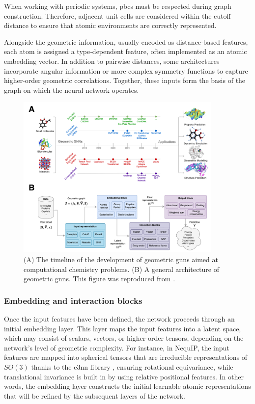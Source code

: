 When working with periodic systems, \acp{pbc} must be respected during graph construction. Therefore, adjacent unit cells are considered within the cutoff distance to ensure that atomic environments are correctly represented.

Alongside the geometric information, usually encoded as distance-based features, each atom is assigned a type-dependent feature, often implemented as an atomic embedding vector. In addition to pairwise distances, some architectures incorporate angular information or more complex symmetry functions to capture higher-order geometric correlations. Together, these inputs form the basis of the graph on which the neural network operates.

\begin{figure}[t!]
    \centering
    \includegraphics[width=0.9\textwidth]{Figures/2_Theory/equivariant_gnns.png}
    \caption{(A) The timeline of the development of geometric \acp{gnn} aimed at computational chemistry problems. (B) A general architecture of geometric \acp{gnn}. This figure was reproduced from \citep{duvalHitchhikersGuideGeometric2024}.}
    \label{fig:equivariant_gnns}
\end{figure}

\subsubsection{Embedding and interaction blocks}
Once the input features have been defined, the network proceeds through an initial embedding layer. This layer maps the input features into a latent space, which may consist of scalars, vectors, or higher-order tensors, depending on the network’s level of geometric complexity. For instance, in NequIP, the input features are mapped into spherical tensors that are irreducible representations of $SO(3)$ thanks to the e3nn library \citep{geigerE3nnEuclideanNeural2022}, ensuring rotational equivariance, while translational invariance is built in by using relative positional features. In other words, the embedding layer constructs the initial learnable atomic representations that will be refined by the subsequent layers of the network.

